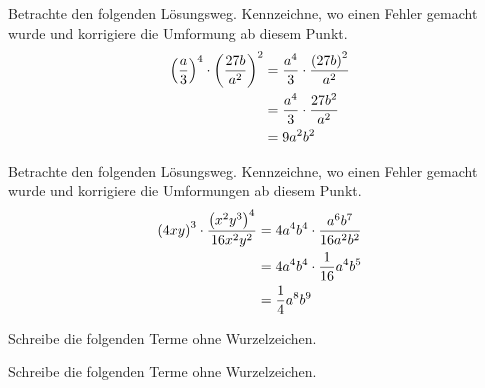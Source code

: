 \documentclass[11pt]{exam}
\begin{document}
\begin{questions}
\question[3]
Betrachte den folgenden Lösungsweg. Kennzeichne, wo einen Fehler gemacht wurde und korrigiere die Umformung ab diesem Punkt.
\begin{align*}
    \left(\frac{a}{3}\right)^4\cdot\left(\frac{27b}{a^2}\right)^2 &= \frac{a^4}{3}\cdot\frac{\left(27b\right)^2}{a^2}\\
    &= \frac{a^4}{3}\cdot\frac{27b^2}{a^2} \\
    &= 9a^2b^2
\end{align*}

\question[4]
Betrachte den folgenden Lösungsweg. Kennzeichne, wo einen Fehler gemacht wurde und korrigiere die Umformungen ab diesem Punkt.
\begin{align*}
	\left(4xy\right)^3\cdot\frac{\left(x^2y^3\right)^4}{16x^2y^2}&=4a^4b^4\cdot\frac{a^6b^7}{16a^2b^2}\\
	&= 4a^4b^4\cdot\frac{1}{16}a^4b^5\\
	&= \frac{1}{4}a^8b^9
\end{align*}






\question[4]
Schreibe die folgenden Terme ohne Wurzelzeichen.

\question[4]
Schreibe die folgenden Terme ohne Wurzelzeichen.



\end{questions}
\end{document}
